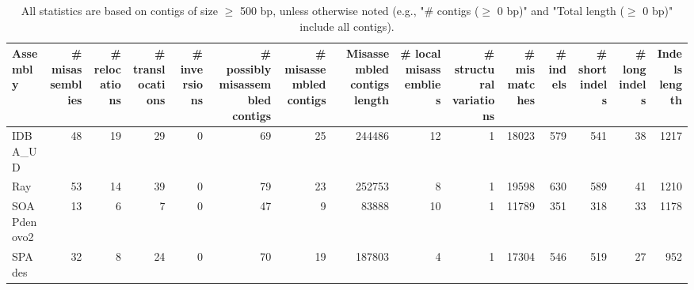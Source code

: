 \documentclass[12pt,a4paper]{article}
\begin{document}
\begin{table}[ht]
\begin{center}
\caption{All statistics are based on contigs of size $\geq$ 500 bp, unless otherwise noted (e.g., "\# contigs ($\geq$ 0 bp)" and "Total length ($\geq$ 0 bp)" include all contigs).}
\begin{tabular}{|l*{14}{|r}|}
\hline
Assembly & \# misassemblies &     \# relocations &     \# translocations &     \# inversions & \# possibly misassembled contigs & \# misassembled contigs & Misassembled contigs length & \# local misassemblies & \# structural variations & \# mismatches & \# indels &     \# short indels &     \# long indels & Indels length \\ \hline
IDBA\_UD & 48 & 19 & 29 & 0 & 69 & 25 & 244486 & 12 & 1 & 18023 & 579 & 541 & 38 & 1217 \\ \hline
Ray & 53 & 14 & 39 & 0 & 79 & 23 & 252753 & 8 & 1 & 19598 & 630 & 589 & 41 & 1210 \\ \hline
SOAPdenovo2 & 13 & 6 & 7 & 0 & 47 & 9 & 83888 & 10 & 1 & 11789 & 351 & 318 & 33 & 1178 \\ \hline
SPAdes & 32 & 8 & 24 & 0 & 70 & 19 & 187803 & 4 & 1 & 17304 & 546 & 519 & 27 & 952 \\ \hline
\end{tabular}
\end{center}
\end{table}
\end{document}
